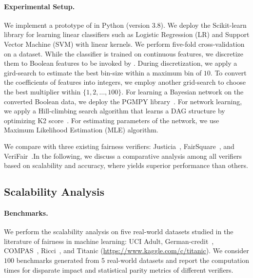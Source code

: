 \paragraph{Experimental Setup.}
We  implement a  prototype of {\fvgm} in Python (version 3.8).  
We deploy the Scikit-learn library for learning linear classifiers such as Logistic Regression (LR) and Support Vector Machine (SVM) with linear kernels. We perform five-fold cross-validation on a dataset. While the classifier is trained on continuous features, we discretize them to Boolean features to be invoked by {\fvgm}. During discretization, we apply a gird-search to estimate the best bin-size within a maximum bin of $ 10 $. To convert the coefficients of features into integers, we employ another grid-search to choose the best multiplier within $ \{1,2, \dots, 100\} $. For learning a Bayesian network on the converted Boolean data, we deploy the PGMPY library~\cite{ankan2015pgmpy}. For network learning, we apply a Hill-climbing search algorithm that learns a DAG structure by optimizing K2 score~\cite{koller2009probabilistic}. For estimating parameters of the network, we use Maximum Likelihood Estimation (MLE) algorithm. 

We compare {\fvgm} with three existing fairness verifiers: Justicia~\cite{ghosh2020justicia}, FairSquare~\cite{albarghouthi2017fairsquare}, and VeriFair~\cite{bastani2019probabilistic}.In the following, we discuss a comparative analysis among all verifiers based on scalability and accuracy, where {\fvgm} yields superior performance than others. 
 


\subsection{Scalability Analysis}
\paragraph{Benchmarks.} We perform the scalability analysis on five real-world datasets studied in the literature of fairness in machine learning: UCI Adult, German-credit~\cite{DK2017}, COMPAS~\cite{angwin2016machine}, Ricci~\cite{mcginley2010ricci}, and Titanic (\url{https://www.kaggle.com/c/titanic}). We consider $ 100 $ benchmarks generated from 5 real-world datasets and report the computation times for disparate impact and statistical parity metrics of different verifiers.

